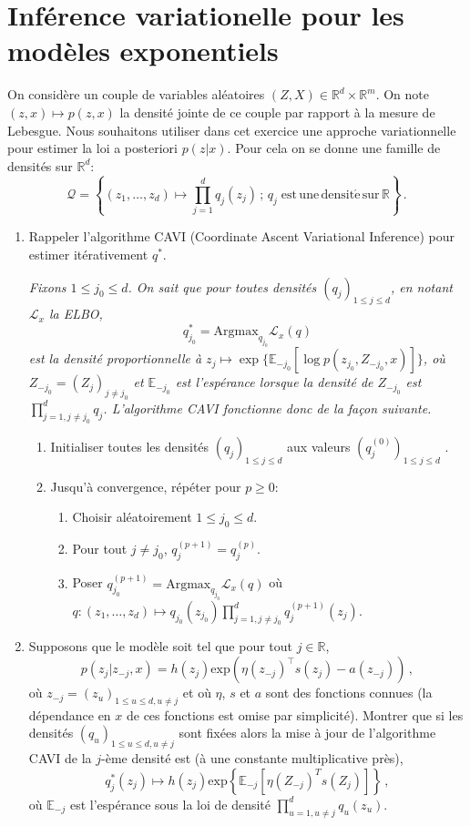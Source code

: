 \documentclass[a4paper,10pt,fleqn]{article}
\newcommand{\eqsp}{\,}
\newcommand{\1}{\ensuremath{\mathbbm{1}}}
\begin{document}
\section{Inf\'erence variationelle pour les mod\`eles exponentiels}
On consid\`ere un couple de variables al\'eatoires $(Z,X)\in\mathbb{R}^d\times \mathbb{R}^m$. On note $(z,x) \mapsto p(z,x)$ la densit\'e jointe de ce couple par rapport \`a la mesure de Lebesgue. Nous souhaitons utiliser dans cet exercice une approche variationnelle pour estimer la loi a posteriori $p(z|x)$. Pour cela on se donne une famille de densit\'es sur $\mathbb{R}^d$:
$$
\mathcal{Q} = \left\{(z_1,\ldots,z_d)\mapsto \prod_{j=1}^dq_j(z_j)\eqsp;\eqsp q_j\; \mathrm{est\,une\,densit\acute e\,sur\,\mathbb{R}}\right\}\eqsp.
$$
\begin{enumerate}
\item Rappeler l'algorithme CAVI (Coordinate Ascent Variational Inference) pour estimer it\'erativement $q^*$.

\vspace{.2cm}

{\em
Fixons $1\leq j_0 \leq d$. On sait que pour toutes densit\'es $(q_j)_{1\leq j \leq d}$, en notant $\mathcal{L}_x$ la ELBO,
$$
q_{j_0}^* = \mathrm{Argmax}_{q_{j_0}} \mathcal{L}_x(q) 
$$
est la densit\'e proportionnelle \`a $z_j \mapsto \exp\{\mathbb{E}_{-j_0}[\log p (z_{j_0},Z_{-j_0},x)]\}$, o\`u $Z_{-j_0} = (Z_j)_{j\neq j_0}$ et $\mathbb{E}_{-j_0}$ est l'esp\'erance lorsque la densit\'e de $Z_{-j_0}$ est $\prod_{j=1,j\neq j_0}^dq_j$. L'algorithme CAVI fonctionne donc de la fa\c con suivante.
\begin{enumerate}
\item Initialiser toutes les densit\'es $(q_j)_{1\leq j \leq d}$ aux valeurs $(q^{(0)}_j)_{1\leq j \leq d}$ .
\item Jusqu'\`a convergence, r\'ep\'eter pour $p\geq 0$:
\begin{enumerate}
\item Choisir al\'eatoirement $1\leq j_0 \leq d$.
\item Pour tout $j\neq j_0$, $q^{(p+1)}_j = q^{(p)}_j$.
\item Poser $q^{(p+1)}_{j_0} = \mathrm{Argmax}_{q_{j_0}} \mathcal{L}_x(q)$ o\`u $q:(z_1,\ldots,z_d)\mapsto q_{j_0}(z_{j_0})\prod_{j=1,j\neq j_0}^{d}q^{(p+1)}_j(z_j)$. 
\end{enumerate}
\end{enumerate}
}
\item Supposons que le mod\`ele soit tel que pour tout $j\in\mathbb{R}$, 
$$
p(z_j|z_{-j},x) = h(z_j)\mathrm{exp}(\eta(z_{-j})^\top s(z_j) - a(z_{-j}))\eqsp,
$$ 
o\`u $z_{-j} = (z_u)_{1\leqslant u\leqslant d, u \neq j}$ et o\`u $\eta$, $s$ et $a$ sont des fonctions connues (la d\'ependance en $x$ de ces fonctions est omise par simplicit\'e). Montrer que si les densit\'es $(q_u)_{1\leqslant u\leqslant d, u \neq j}$ sont fix\'ees alors la mise \`a jour de l'algorithme CAVI de la $j$-\`eme densit\'e est  (\`a une constante multiplicative pr\`es),
$$
q^*_j(z_j) \mapsto h(z_j) \mathrm{exp}\left\{\mathbb{E}_{-j}[\eta(Z_{-j})^Ts(Z_j)]\right\}\eqsp,
$$
o\`u $\mathbb{E}_{-j}$ est l'esp\'erance sous la loi de densit\'e $\prod_{u=1, u\neq j}^d q_u(z_u)$.


\end{enumerate}
\end{document}
